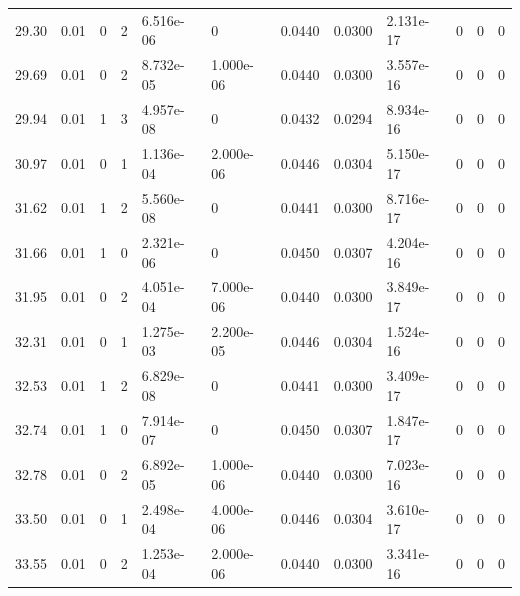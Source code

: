 \documentclass[preview]{standalone}
\begin{document}
{{{\begin{tabular}{L{1.2cm}C{1.2cm} C{0.3cm}C{0.5cm} C{1.4cm}C{1.4cm} C{1.4cm}C{1.4cm} C{1.6cm}C{1.6cm} C{1.6cm}C{1.6cm}}
  29.30  &  0.01  & 0     &  2 &  6.516e-06  & 0  &  0.0440&   0.0300& 2.131e-17 & 0   &  0 & 0  \\ 
  29.69  &  0.01  & 0     &  2 &  8.732e-05  & 1.000e-06  &  0.0440&   0.0300& 3.557e-16 & 0   &  0 & 0  \\ 
  29.94  &  0.01  & 1     &  3 &  4.957e-08  & 0  &  0.0432&   0.0294& 8.934e-16 & 0   &  0 & 0  \\ 
  30.97  &  0.01  & 0     &  1 &  1.136e-04  & 2.000e-06  &  0.0446&   0.0304& 5.150e-17 & 0   &  0 & 0  \\ 
  31.62  &  0.01  & 1     &  2 &  5.560e-08  & 0  &  0.0441&   0.0300& 8.716e-17 & 0   &  0 & 0  \\ 
  31.66  &  0.01  & 1     &  0 &  2.321e-06  & 0  &  0.0450&   0.0307& 4.204e-16 & 0   &  0 & 0  \\ 
  31.95  &  0.01  & 0     &  2 &  4.051e-04  & 7.000e-06  &  0.0440&   0.0300& 3.849e-17 & 0   &  0 & 0  \\ 
  32.31  &  0.01  & 0     &  1 &  1.275e-03  & 2.200e-05  &  0.0446&   0.0304& 1.524e-16 & 0   &  0 & 0  \\ 
  32.53  &  0.01  & 1     &  2 &  6.829e-08  & 0  &  0.0441&   0.0300& 3.409e-17 & 0   &  0 & 0  \\ 
  32.74  &  0.01  & 1     &  0 &  7.914e-07  & 0  &  0.0450&   0.0307& 1.847e-17 & 0   &  0 & 0  \\ 
  32.78  &  0.01  & 0     &  2 &  6.892e-05  & 1.000e-06  &  0.0440&   0.0300& 7.023e-16 & 0   &  0 & 0  \\ 
  33.50  &  0.01  & 0     &  1 &  2.498e-04  & 4.000e-06  &  0.0446&   0.0304& 3.610e-17 & 0   &  0 & 0  \\ 
  33.55  &  0.01  & 0     &  2 &  1.253e-04  & 2.000e-06  &  0.0440&   0.0300& 3.341e-16 & 0   &  0 & 0  \\ 
\hline 
\end{tabular} 

}}}
\end{document}
